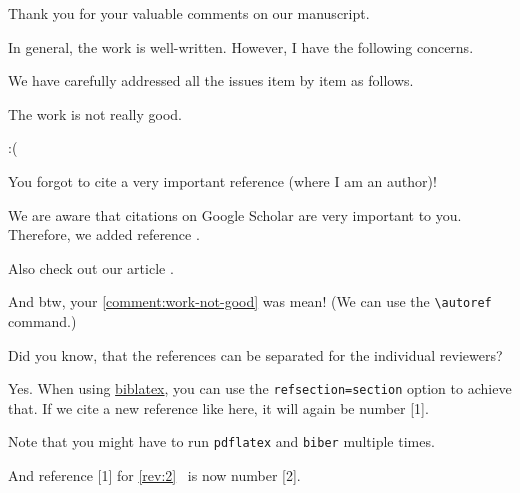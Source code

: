 \documentclass[12pt,english]{reviewresponse}
\begin{document}
\begin{concludingresponse}[]
	Thank you for your valuable comments on our manuscript. 
\end{concludingresponse}

\reviewer
\label{rev:2}
\begin{generalcomment}
	In general, the work is well-written. However, I have the following concerns.
\end{generalcomment}
\begin{revresponse}
	We have carefully addressed all the issues item by item as follows.
\end{revresponse}

\begin{revcomment}\label{comment:work-not-good}
	The work is not really good.
\end{revcomment}
\begin{revresponse}
	:(
\end{revresponse}

\begin{revcomment}
	You forgot to cite a very important reference (where I am an author)!
\end{revcomment}
\begin{revresponse}
	We are aware that citations on Google Scholar are very important to you.
	Therefore, we added reference \cite{ReviewerReference}.
	
	Also check out our article \cite{Besser2020}.
	
	
	And btw, your \autoref{comment:work-not-good} was mean! (We can use the \verb|\autoref| command.)
\end{revresponse}


\reviewer
\begin{revcomment}
	Did you know, that the references can be separated for the individual reviewers?
\end{revcomment}
\begin{revresponse}
	Yes. When using \href{https://www.ctan.org/pkg/biblatex}{biblatex}, you can use the \texttt{refsection=section} option to achieve that.
	If we cite a new reference like \cite{Besser2021} here, it will again be number [1].
	
	Note that you might have to run \texttt{pdflatex} and \texttt{biber} multiple times.
	
	And reference [1] for \autoref{rev:2}~\cite{ReviewerReference} is now number [2].
	
\end{revresponse}
\end{document}

